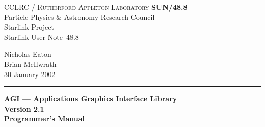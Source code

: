 \documentclass[twoside,11pt]{article}
\newcommand{\stardoccategory}  {Starlink User Note}
\newcommand{\stardocinitials}  {SUN}
\newcommand{\stardocnumber}    {48.8}
\newcommand{\stardocauthors}   {Nicholas Eaton\\Brian McIlwrath}
\newcommand{\stardocdate}      {30 January 2002}
\newcommand{\stardoctitle}     {AGI --- Applications Graphics Interface
                                Library}
\newcommand{\stardocversion}   {Version 2.1}
\newcommand{\stardocmanual}    {Programmer's Manual}
\newcommand{\stardocname}{\stardocinitials /\stardocnumber}
\newenvironment{latexonly}{}{}
\renewcommand{\_}{\texttt{\symbol{95}}}
\begin{document}
\thispagestyle{empty}

\begin{latexonly}
   CCLRC / \textsc{Rutherford Appleton Laboratory} \hfill \textbf{\stardocname}\\
   {\large Particle Physics \& Astronomy Research Council}\\
   {\large Starlink Project\\}
   {\large \stardoccategory\ \stardocnumber}
   \begin{flushright}
   \stardocauthors\\
   \stardocdate
   \end{flushright}
   \vspace{-4mm}
   \rule{\textwidth}{0.5mm}
   \vspace{5mm}
   \begin{center}
   {\Huge\textbf{\stardoctitle \\ [2.5ex]}}
   {\LARGE\textbf{\stardocversion \\ [4ex]}}
   {\Huge\textbf{\stardocmanual}}
   \end{center}
   \vspace{5mm}

   

\end{latexonly}
\end{document}
